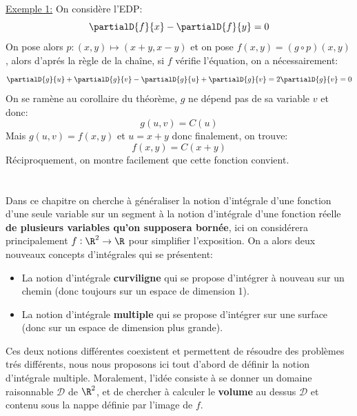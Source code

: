 \uline{Exemple 1:} On considère l'EDP:
\[
   \partialD{f}{x} - \partialD{f}{y} = 0   
\]
On pose alors \(p: (x, y) \mapsto (x + y, x - y)\) et on pose \(f(x, y) = (g \circ p)(x, y)\), alors d'aprés la règle de la chaîne, si \(f\) vérifie l'équation, on a nécessairement:
\[
   \partialD{g}{u} + \partialD{g}{v} - \partialD{g}{u} + \partialD{g}{v} = 2\partialD{g}{v} = 0
\]
On se ramène au corollaire du théorème, \(g\) ne dépend pas de sa variable \(v\) et donc:
\[
   g(u, v) = C(u)   
\]
Mais \(g(u, v) = f(x, y)\) et \(u = x + y\) donc finalement, on trouve:
\[
   f(x, y) = C(x + y)    
\]
Réciproquement, on montre facilement que cette fonction convient.

\chapter*{}

\chapter*{}
Dans ce chapitre on cherche à généraliser la notion d'intégrale d'une fonction d'une seule variable sur un segment à la notion d'intégrale d'une fonction réelle \textbf{de plusieurs variables qu'on supposera bornée}, ici on considérera principalement \(f : \R^2 \rightarrow \R\) pour simplifier l'exposition. On a alors deux nouveaux concepts d'intégrales qui se présentent:
\begin{itemize}
   \item La notion d'intégrale \textbf{curviligne} qui se propose d'intégrer à nouveau sur un chemin (donc toujours sur un espace de dimension 1).
   \item La notion d'intégrale \textbf{multiple} qui se propose d'intégrer sur une surface (donc sur un espace de dimension plus grande).
\end{itemize}
Ces deux notions différentes coexistent et permettent de résoudre des problèmes trés différents, nous nous proposons ici tout d'abord de définir la notion d'intégrale multiple. Moralement, l'idée consiste à se donner un domaine raisonnable \(\mathcal{D}\) de \(\R^2\), et de chercher à calculer le \textbf{volume} au dessus \(\mathcal{D}\) et contenu sous la nappe définie par l'image de \(f\). 

